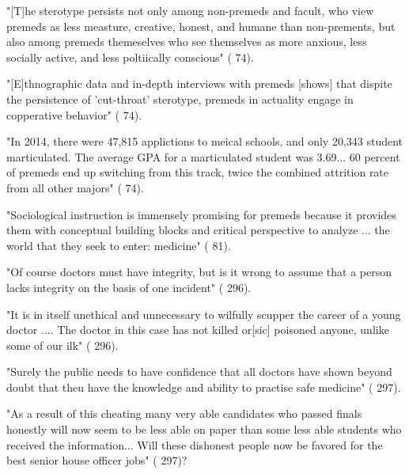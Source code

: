"[T]he sterotype persists not only among non-premeds and facult, who view premeds as less measture, creative, honest, and humane than non-prements, but also among premeds themeselves who see themselves as more anxious, less socially active, and less poltiically conscious" (\cite{Olsen-2016} 74).

"[E]thnographic data and in-depth interviews with premeds [shows] that dispite the persistence of 'cut-throat' sterotype, premeds in actuality engage in copperative behavior" (\cite{Olsen-2016} 74).

"In 2014, there were 47,815 applictions to meical schools, and only 20,343 student marticulated. The average GPA for a marticulated student was 3.69... 60 percent of premeds end up switching from this track, twice the combined attrition rate from all other majors" (\cite{Olsen-2016} 74).

"Sociological instruction is immensely promising for premeds because it provides them with conceptual building blocks and critical perspective to analyze ... the world that they seek to enter: medicine" (\cite{Olsen-2016} 81).


"Of course doctors must have integrity, but is it wrong to assume that a person lacks integrity on the basis of one incident" (\cite{Spencer-2001} 296).

"It is in itself unethical and unnecessary to wilfully scupper the career of a young doctor .... The doctor in this case has not killed or[sic] poisoned anyone, unlike some of our ilk" (\cite{Spencer-2001} 296).

"Surely the public needs to have confidence that all doctors have shown beyond doubt that theu have the knowledge and ability to practise safe medicine" (\cite{Spencer-2001} 297).

"As a result of this cheating many very able candidates who passed finals honestly will now seem to be less able on paper than some less able students who received the information... Will these dishonest people now be favored for the best senior house officer jobs" (\cite{Spencer-2001} 297)?
